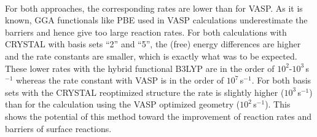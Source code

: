 \documentclass[11pt,DIV=13,BCOR=5mm,a4paper,headinclude]{scrbook}
\begin{document}
\\
For both approaches, the corresponding rates are lower than for VASP. As it is known, GGA functionals like PBE used in VASP calculations underestimate the barriers\cite{Zhao05} and hence give too large reaction rates.
For both calculations with CRYSTAL with basis sets ``2'' and ``5'', the (free) energy differences are higher and the rate constants are smaller, which is exactly what was to be expected.
These lower rates with the hybrid functional B3LYP are in the order of $10^2$-$10^3\,$s$^{-1}$ whereas the rate constant with VASP is in the order of $10^7\,$s$^{-1}$. 
For both basis sets with the CRYSTAL reoptimized structure the rate is slightly higher ($10^3\,$s$^{-1}$) than for the calculation using the VASP optimized geometry ($10^2\,$s$^{-1}$).
This shows the potential of this method toward the improvement of reaction rates and barriers of surface reactions.
\end{document}
